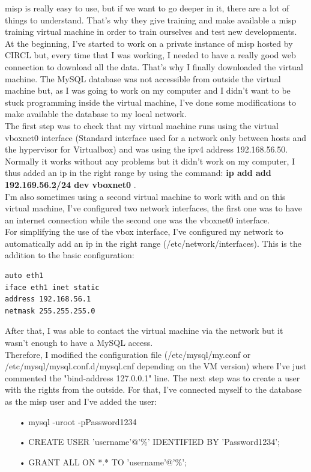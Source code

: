 \documentclass{eplmastersthesis}
\begin{document}
\gls{misp} is really easy to use, but if we want to go deeper in it, there are a lot of things to understand. That's why they give training and make available a \gls{misp} training virtual machine in order to train ourselves and test new developments.\\
At the beginning, I've started to work on a private instance of \gls{misp} hosted by CIRCL but, every time that I was working, I needed to have a really good web connection to download all the data. That's why I finally downloaded the virtual machine. 
The MySQL database was not accessible from outside the virtual machine but, as I was going to work on my computer and I didn't want to be stuck programming inside the virtual machine, I've done some modifications to make available the database to my local network.\\
The first step was to check that my virtual machine runs using the virtual vboxnet0 interface (Standard interface used for a network only between hosts and the hypervisor for Virtualbox) and was using the \gls{ipv4} address 192.168.56.50. Normally it works without any problems but it didn't work on my computer, I thus added an \gls{ip} in the right range by using the command:
\textbf{ip add add 192.169.56.2/24 dev vboxnet0} .\\
I'm also sometimes using a second virtual machine to work with and on this virtual machine, I've configured two network interfaces, the first one was to have an internet connection while the second one was the vboxnet0 interface.\\
For simplifying the use of the vbox interface, I've configured my network to automatically add an \gls{ip} in the right range (/etc/network/interfaces). This is the addition to the basic configuration:
\begin{verbatim}
auto eth1
iface eth1 inet static
address 192.168.56.1
netmask 255.255.255.0
\end{verbatim}
 
After that, I was able to contact the virtual machine via the network but it wasn't enough to have a MySQL access. \\
Therefore, I modified the configuration file (/etc/mysql/my.conf or /etc/mysql/mysql.conf.d/mysql.cnf depending on the VM version) where I've just commented the "bind-address 127.0.0.1" line.
The next step was to create a user with the rights from the outside. For that, I've connected myself to the database as the \gls{misp} user and I've added the user:
\begin{itemize}
\item[•] mysql -uroot -pPassword1234 
\item[•] CREATE USER 'username'@'\%' IDENTIFIED BY 'Password1234';
\item[•] GRANT ALL ON *.* TO 'username'@'\%';
\end{itemize}
\end{document}
